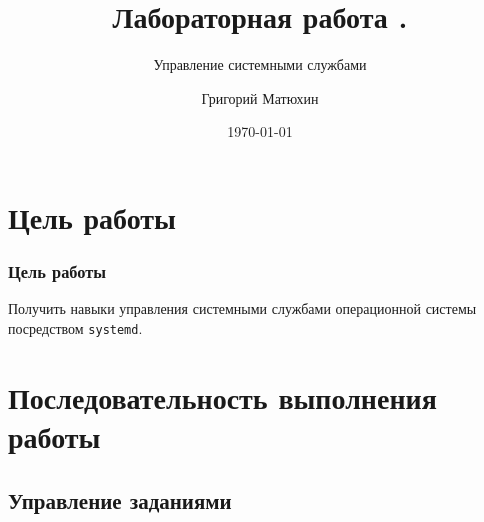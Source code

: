 \documentclass{beamer}
\author{Григорий Матюхин}
\date{\today}
\title{Лабораторная работа \textnumero4.}
\subtitle{Управление системными службами}
\begin{document}
\begin{frame}[plain]
	\titlepage
\end{frame}
\section{Цель работы}
\begin{frame}[plain]
	\frametitle{Цель работы}
	Получить навыки управления системными службами операционной системы посредством \texttt{systemd}.
\end{frame}

\section{Последовательность выполнения работы}
\subsection{Управление заданиями}
\end{document}
